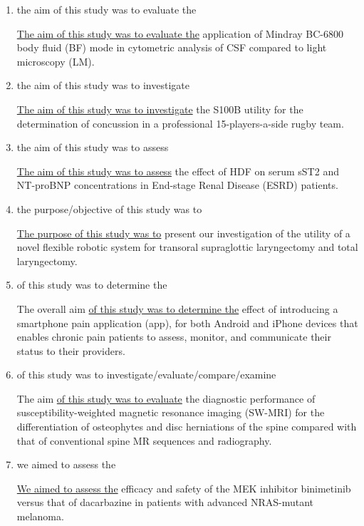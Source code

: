 \documentclass[a4paper]{ctexbook}
\begin{document}
    \begin{enumerate}
      \item the aim of this study was to evaluate the
      \begin{eg}{}
        \uline{The aim of this study was to evaluate the} application of Mindray BC-6800 body fluid (BF) mode in cytometric analysis of CSF compared to light microscopy (LM).
      \end{eg}

      \item the aim of this study was to investigate
      \begin{eg}{}
        \uline{The aim of this study was to investigate} the S100B utility for the determination of concussion in a professional 15-players-a-side rugby team.
      \end{eg}

      \item the aim of this study was to assess
      \begin{eg}{}
        \uline{The aim of this study was to assess} the effect of HDF on serum sST2 and NT-proBNP concentrations in End-stage Renal Disease (ESRD) patients.
      \end{eg}

      \item the purpose/objective of this study was to
      \begin{eg}{}
        \uline{The purpose of this study was to} present our investigation of the utility of a novel flexible robotic system for transoral supraglottic laryngectomy and total laryngectomy.
      \end{eg}

      \item of this study was to determine the
      \begin{eg}{}
        The overall aim \uline{of this study was to determine the} effect of introducing a smartphone pain application (app), for both Android and iPhone devices that enables chronic pain patients to assess, monitor, and communicate their status to their providers.
      \end{eg}

      \item of this study was to investigate/evaluate/compare/examine
      \begin{eg}{}
        The aim \uline{of this study was to evaluate} the diagnostic performance of susceptibility-weighted magnetic resonance imaging (SW-MRI) for the differentiation of osteophytes and disc herniations of the spine compared with that of conventional spine MR sequences and radiography.
      \end{eg}

      \item we aimed to assess the
      \begin{eg}{}
        \uline{We aimed to assess the} efficacy and safety of the MEK inhibitor binimetinib versus that of dacarbazine in patients with advanced NRAS-mutant melanoma.
      \end{eg}

    \end{enumerate}
\end{document}

